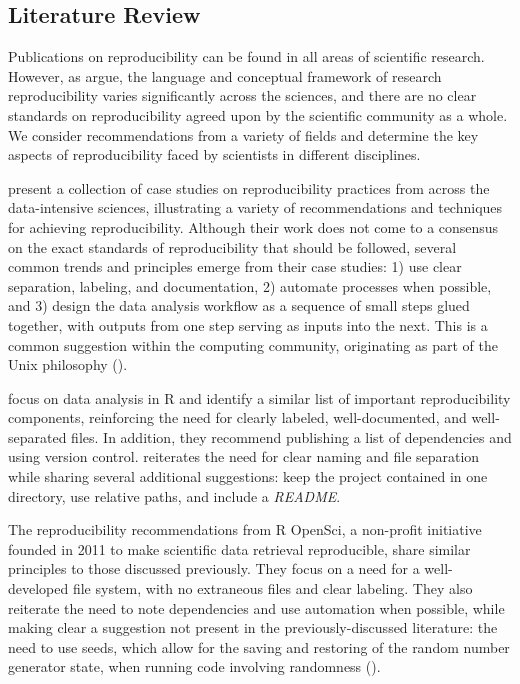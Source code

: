 \documentclass[APA,LATO1COL]{WileyNJD-v2}\usepackage[]{graphicx}\usepackage[]{color}
\newcommand{\R}{\textsf{R}\xspace}
\newcommand{\cmd}[1]{\textit{#1}}
\begin{document}
\subsection{Literature Review}\label{sec:papers}

Publications on reproducibility can be found in all areas of scientific research. However, as \cite{Goodman341ps12} argue, the language and conceptual framework of research reproducibility varies significantly across the sciences, and there are no clear standards on reproducibility agreed upon by the scientific community as a whole. We consider recommendations from a variety of fields and determine the key aspects of reproducibility faced by scientists in different disciplines. 

\cite{kitzes2017practice} present a collection of case studies on reproducibility practices from across the data-intensive sciences, illustrating a variety of recommendations and techniques for achieving reproducibility. Although their work does not come to a consensus on the exact standards of reproducibility that should be followed, several common trends and principles emerge from their case studies: 1) use clear separation, labeling, and documentation, 2) automate processes when possible, and 3) design the data analysis workflow as a sequence of small steps glued together, with outputs from one step serving as inputs into the next. This is a common suggestion within the computing community, originating as part of the Unix philosophy (\cite{unix}).

\cite{cooper2017guide} focus on data analysis in \R and identify a similar list of important reproducibility components, reinforcing the need for clearly labeled, well-documented, and well-separated files. In addition, they recommend publishing a list of dependencies and using version control. 
\cite{broman} reiterates the need for clear naming and file separation while sharing several additional suggestions: keep the project contained in one directory, use relative paths, and include a \cmd{README}.

The reproducibility recommendations from R OpenSci, a non-profit initiative founded in 2011 to make scientific data retrieval reproducible, share similar principles to those discussed previously. They focus on a need for a well-developed file system, with no extraneous files and clear labeling. They also reiterate the need to note dependencies and use automation when possible, while making clear a suggestion not present in the previously-discussed literature: the need to use seeds, which allow for the saving and restoring of the random number generator state, when running code involving randomness (\cite{r-opensci}).
\end{document}
